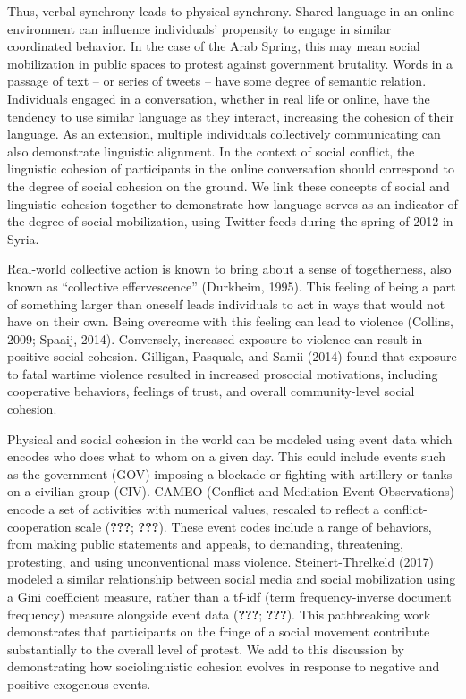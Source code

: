 \documentclass[english,man]{apa6}
\begin{document}
Thus, verbal synchrony leads to physical synchrony. Shared language in an online environment can influence individuals' propensity to engage in similar coordinated behavior. In the case of the Arab Spring, this may mean social mobilization in public spaces to protest against government brutality. Words in a passage of text -- or series of tweets -- have some degree of semantic relation. Individuals engaged in a conversation, whether in real life or online, have the tendency to use similar language as they interact, increasing the cohesion of their language. As an extension, multiple individuals collectively communicating can also demonstrate linguistic alignment. In the context of social conflict, the linguistic cohesion of participants in the online conversation should correspond to the degree of social cohesion on the ground. We link these concepts of social and linguistic cohesion together to demonstrate how language serves as an indicator of the degree of social mobilization, using Twitter feeds during the spring of 2012 in Syria.

Real-world collective action is known to bring about a sense of togetherness,
also known as \enquote{collective effervescence} (Durkheim, 1995). This
feeling of being a part of something larger than oneself leads individuals
to act in ways that would not have on their own. Being overcome with this
feeling can lead to violence (Collins, 2009; Spaaij, 2014).
Conversely, increased exposure
to violence can result in positive social cohesion. Gilligan, Pasquale, and Samii (2014)
found that exposure to fatal wartime violence resulted in increased prosocial
motivations, including cooperative behaviors, feelings of trust, and overall
community-level social cohesion.

Physical and social cohesion in the world can be modeled using event data which encodes who does what to whom on a given day. This could include events such as the government (GOV) imposing a blockade or fighting with artillery or tanks on a civilian group (CIV). CAMEO (Conflict and Mediation Event Observations) encode a set of activities with numerical values, rescaled to reflect a conflict-cooperation scale ({\textbf{???}}; {\textbf{???}}). These event codes include a range of behaviors, from making public statements and appeals, to demanding, threatening, protesting, and using unconventional mass violence. Steinert-Threlkeld (2017) modeled a similar relationship between social media and social mobilization using a Gini coefficient measure, rather than a tf-idf (term frequency-inverse document frequency) measure alongside event data ({\textbf{???}}; {\textbf{???}}). This pathbreaking work demonstrates that participants on the fringe of a social movement contribute substantially to the overall level of protest. We add to this discussion by demonstrating how sociolinguistic cohesion evolves in response to negative and positive exogenous events.
\end{document}
